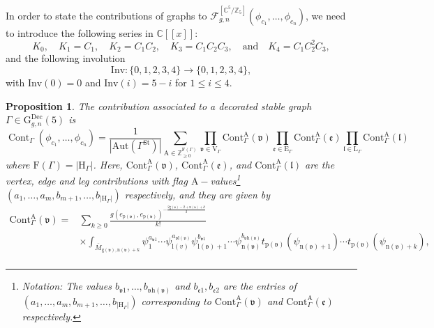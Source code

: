 \documentclass[12pt]{amsart}
\newtheorem{prop}{Proposition}[section]
\numberwithin{equation}{section}
\begin{document}
In order to state the contributions of graphs to $\mathcal{F}_{g, n}^{\left[\mathbb{C}^{5} / \mathbb{Z}_{5}\right]}\left(\phi_{c_{1}}, \ldots, \phi_{c_{n}}\right)$, we need to introduce the following series in $\mathbb{C}[[x]]$:
\begin{equation*}
K_0,\quad K_1=C_1,\quad K_2=C_1C_2,\quad K_3=C_1C_2C_3,\quad\text{and}\quad K_4=C_1C_2^2C_3,
\end{equation*}
and the following involution
$$\mathrm{Inv}:\{0,1,2,3,4\}\rightarrow\{0,1,2,3,4\},$$ with $\mathrm{Inv}(0)=0$ and $\mathrm{Inv}(i)=5-i$ for $1\leq i \leq 4$.
\begin{prop}\label{prop:contributions}
The contribution associated to a decorated stable graph $\Gamma\in\mathrm{G}_{g,n}^{\text{Dec}}(5)$ is
\begin{equation*}
\operatorname{Cont}_{\Gamma}\left(\phi_{c_{1}}, \ldots, \phi_{c_{n}}\right)=\frac{1}{|\mathrm{Aut}(\Gamma^{\mathrm{St}})|} \sum_{\mathrm{A} \in \mathbb{Z}_{\geq 0}^{\mathrm{F}(\Gamma)}} \prod_{\mathfrak{v} \in \mathrm{V}_{\Gamma}} \mathrm{Cont}_{\Gamma}^{\mathrm{A}}(\mathfrak{v}) \prod_{\mathfrak{e}\in \mathrm{E}_{\Gamma}} \mathrm{Cont}_{\Gamma}^{\mathrm{A}}(\mathfrak{e}) \prod_{\mathfrak{l} \in \mathrm{L}_{\Gamma}} \mathrm{Cont}_{\Gamma}^{\mathrm{A}}(\mathfrak{l})
\end{equation*}
where $\mathrm{F}(\Gamma)=\left\vert\mathrm{H}_{\Gamma}\right\vert$. Here, $\mathrm{Cont}_{\Gamma}^{\mathrm{A}}(\mathfrak{v})$, $\mathrm{Cont}_{\Gamma}^{\mathrm{A}}(\mathfrak{e})$, and $\mathrm{Cont}_{\Gamma}^{\mathrm{A}}(\mathfrak{l})$ are the {\em vertex}, {\em edge} and {\em leg} contributions with flag $\mathrm{A}-$values\footnote{Notation: The values ${b_{\mathfrak{v}1}},\ldots,{b_{\mathfrak{v}\mathrm{h}(\mathfrak{v})}}$ and $b_{\mathfrak{e}1},b_{\mathfrak{e}2}$ are the entries of $(a_1,\ldots,a_m,b_{m+1},\ldots,b_{\left\vert\mathrm{H}_{\Gamma}\right\vert})$ corresponding to $\mathrm{Cont}_{\Gamma}^{\mathrm{A}}(\mathfrak{v})$ and $\mathrm{Cont}_{\Gamma}^{\mathrm{A}}(\mathfrak{e})$ respectively.} $(a_1,\ldots,a_m,b_{m+1},\ldots,b_{\left\vert\mathrm{H}_{\Gamma}\right\vert})$ respectively, and they are given by
\begin{equation*}
\begin{aligned}
    \mathrm{Cont}_{\Gamma}^{\mathrm{A}}(\mathfrak{v})
    =&\sum_{k \geq 0} \frac{g({e}_{\mathrm{p}(\mathfrak{v})},{e}_{\mathrm{p}(\mathfrak{v})})^{-\frac{2\mathrm{g}(\mathfrak{v})-2+\mathrm{n}(\mathfrak{v})+k}{2}}}{k !}\\
    &\times\int_{\overline{M}_{\mathrm{g}(\mathfrak{v}),\mathrm{n}(\mathfrak{v})+k}}\psi_1^{a_{\mathfrak{v}1}}\cdots\psi_{\mathrm{l}(v)}^{a_{\mathfrak{v}\mathrm{l}(\mathfrak{v})}}\psi_{\mathrm{l}(\mathfrak{v})+1}^{b_{\mathfrak{v}1}}\cdots\psi_{\mathrm{n}(\mathfrak{v})}^{b_{\mathfrak{v}\mathrm{h}(\mathfrak{v})}}t_{\mathrm{p}(\mathfrak{v})}(\psi_{\mathrm{n}(\mathfrak{v})+1})\cdots t_{\mathrm{p}(\mathfrak{v})}(\psi_{\mathrm{n}(\mathfrak{v})+k}),\\

\end{aligned}
\end{equation*}
\end{prop}
\end{document}
